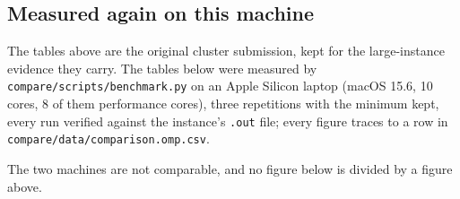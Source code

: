 \documentclass[twocolumn]{article}
\begin{document}
    \subsection{Measured again on this machine}\label{subsec:local}
    The tables above are the original cluster submission, kept for the large-instance
    evidence they carry. The tables below were measured by
    \texttt{compare/scripts/benchmark.py} on an Apple Silicon laptop (macOS 15.6, 10
    cores, 8 of them performance cores), three repetitions with the minimum kept, every
    run verified against the instance's \texttt{.out} file; every figure traces to a row
    in \texttt{compare/data/comparison.omp.csv}.

    The two machines are not comparable, and no figure below is divided by a figure above.

    \begin{table}[!h]
        \caption{\label{tab:time-local}Total execution time, seconds --- \textbf{this
        laptop}, regenerable from this repository.}
        \centering
    \end{table}

    \begin{table}[!h]
        \caption{\label{tab:speedup-local}Speedup over the serial baseline measured in
        the same run --- \textbf{this laptop}.}
        \centering
    \end{table}
\end{document}
